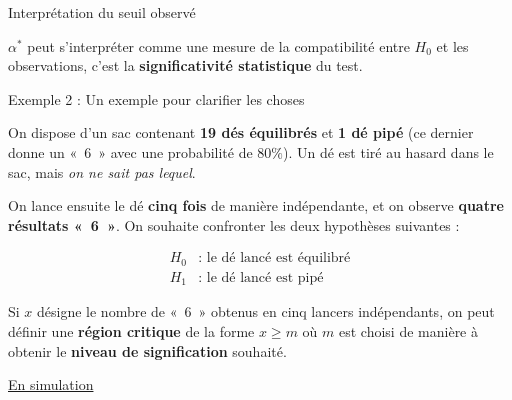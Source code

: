 \documentclass{BeamerTemplate}
\begin{document}




\begin{frame}[t]{Interprétation du seuil observé}

 $\alpha^*$ peut s'interpréter comme %
 \alert{une mesure de la compatibilité entre $H_0$ et les observations}, c'est la {\bf significativité statistique} du test.

\vspace{3mm}


\vspace{3mm}

\end{frame}

\begin{frame}[t]{Exemple 2 : Un exemple pour clarifier les choses}

{\small
On dispose d’un sac contenant \textbf{19 dés équilibrés} et \textbf{1 dé pipé} 
(ce dernier donne un «~6~» avec une probabilité de $80\%$). 
Un dé est tiré au hasard dans le sac, mais \textit{on ne sait pas lequel}. 

On lance ensuite le dé \textbf{cinq fois} de manière indépendante, et on observe 
\textbf{quatre résultats «~6~»}. 
On souhaite confronter les deux hypothèses suivantes :

\begin{align*}
    H_0 &: \text{ le dé lancé est équilibré}\\
    H_1 &: \text{ le dé lancé est pipé}
\end{align*}

Si $x$ désigne le nombre de «~6~» obtenus en cinq lancers indépendants, 
on peut définir une \textbf{région critique} de la forme $x \ge m$ où $m$ est choisi de manière à obtenir le \textbf{niveau de signification} souhaité.

\medskip
{}
}

\href{https://jmiron.shinyapps.io/exempleDes/}{En simulation}
\end{frame}
\end{document}
